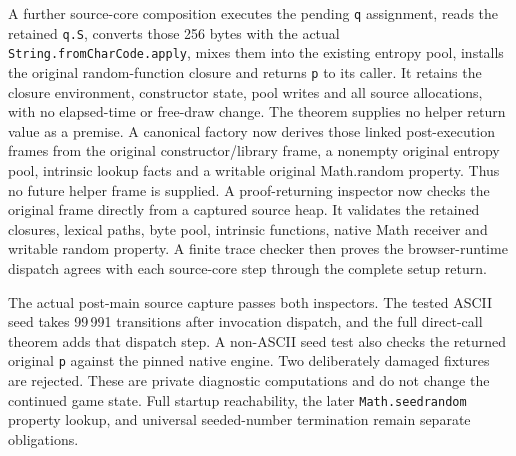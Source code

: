 \documentclass[11pt,a4paper]{article}
\numberwithin{equation}{section}
\theoremstyle{definition}
\theoremstyle{remark}
\begin{document}
A further source-core composition executes the pending \texttt{q} assignment, reads the retained \texttt{q.S}, converts those 256 bytes with the actual \texttt{String.fromCharCode.apply}, mixes them into the existing entropy pool, installs the original random-function closure and returns \texttt{p} to its caller. It retains the closure environment, constructor state, pool writes and all source allocations, with no elapsed-time or free-draw change. The theorem supplies no helper return value as a premise. A canonical factory now derives those linked post-execution frames from the original constructor/library frame, a nonempty original entropy pool, intrinsic lookup facts and a writable original Math.random property. Thus no future helper frame is supplied. A proof-returning inspector now checks the original frame directly from a captured source heap. It validates the retained closures, lexical paths, byte pool, intrinsic functions, native Math receiver and writable random property. A finite trace checker then proves the browser-runtime dispatch agrees with each source-core step through the complete setup return.

The actual post-main source capture passes both inspectors. The tested ASCII seed takes 99\,991 transitions after invocation dispatch, and the full direct-call theorem adds that dispatch step. A non-ASCII seed test also checks the returned original \texttt{p} against the pinned native engine. Two deliberately damaged fixtures are rejected. These are private diagnostic computations and do not change the continued game state. Full startup reachability, the later \texttt{Math.seedrandom} property lookup, and universal seeded-number termination remain separate obligations.
\end{document}
